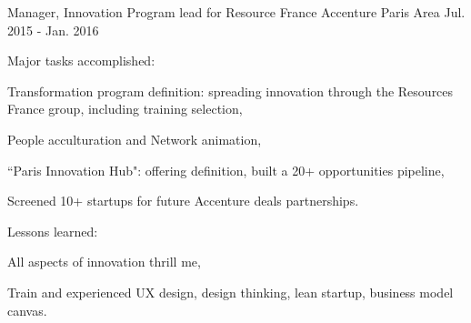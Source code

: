\begin{cventries}
  \cventry
    {Manager, Innovation Program lead for Resource France} %
    {Accenture} %
    {Paris Area} %
    {Jul. 2015 - Jan. 2016} %
    {
      \begin{cvitems} %
        \item {Major tasks accomplished:}
        \begin{cvsubitems}
          \item {Transformation program definition: spreading innovation through the Resources France group, including training selection,}
          \item {People acculturation and Network animation,}
          \item {``Paris Innovation Hub": offering definition, built a 20+ opportunities pipeline,}
          \item {Screened 10+ startups for future Accenture deals partnerships.}
        \end{cvsubitems}
        \item {Lessons learned:}
        \begin{cvsubitems}
          \item {All aspects of innovation thrill me,}
          \item {Train and experienced UX design, design thinking, lean startup, business model canvas.}
        \end{cvsubitems}
      \end{cvitems}
    }


\end{cventries}

